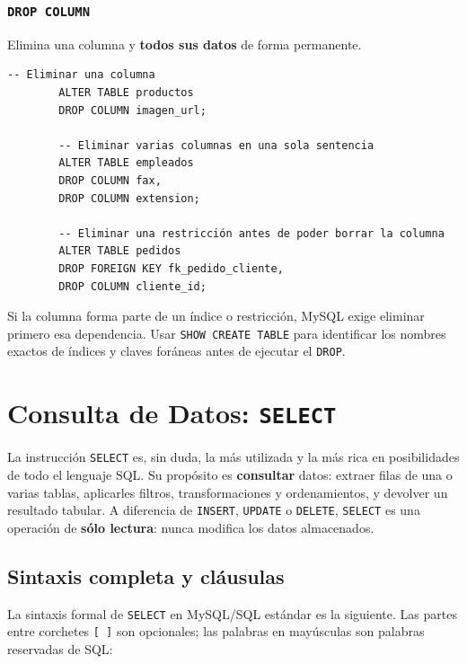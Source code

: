 \documentclass[12pt, a4paper]{article}
\begin{document}
	\subsubsection{\texttt{DROP COLUMN}}
	
	Elimina una columna y \textbf{todos sus datos} de forma permanente.
	
	\begin{lstlisting}[style=sql, caption={DROP COLUMN}]
		-- Eliminar una columna
		ALTER TABLE productos
		DROP COLUMN imagen_url;
		
		-- Eliminar varias columnas en una sola sentencia
		ALTER TABLE empleados
		DROP COLUMN fax,
		DROP COLUMN extension;
		
		-- Eliminar una restricción antes de poder borrar la columna
		ALTER TABLE pedidos
		DROP FOREIGN KEY fk_pedido_cliente,
		DROP COLUMN cliente_id;
	\end{lstlisting}
	
	\begin{nota}
		Si la columna forma parte de un índice o restricción, MySQL exige
		eliminar primero esa dependencia. Usar \texttt{SHOW CREATE TABLE}
		para identificar los nombres exactos de índices y claves foráneas
		antes de ejecutar el \texttt{DROP}.
	\end{nota}
	
	
	\newpage
	\section{Consulta de Datos: \texttt{SELECT}}
	
	La instrucción \texttt{SELECT} es, sin duda, la más utilizada y la
	más rica en posibilidades de todo el lenguaje SQL.
	Su propósito es \textbf{consultar} datos: extraer filas de una o
	varias tablas, aplicarles filtros, transformaciones y ordenamientos,
	y devolver un resultado tabular.
	A diferencia de \texttt{INSERT}, \texttt{UPDATE} o \texttt{DELETE},
	\texttt{SELECT} es una operación de \textbf{sólo lectura}: nunca
	modifica los datos almacenados.
	
	\subsection{Sintaxis completa y cláusulas}
	
	La sintaxis formal de \texttt{SELECT} en MySQL/SQL estándar es la
	siguiente.
	Las partes entre corchetes \texttt{[ ]} son opcionales; las palabras
	en mayúsculas son palabras reservadas de SQL:
	
\end{document}

